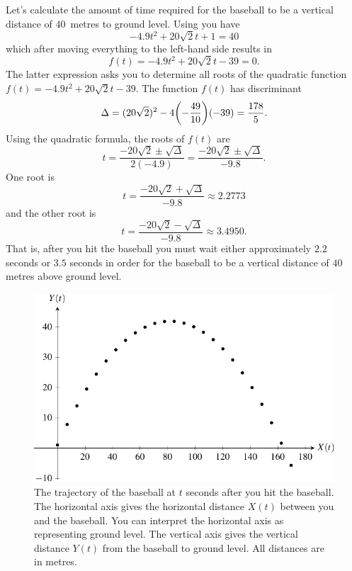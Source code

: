 \documentclass[a4paper,oneside,12pt]{article}
\begin{document}
\begin{problem}
{\begin{solution}
Let's calculate the amount of time required for the baseball to be a
vertical distance of $40$~metres to ground level.  Using
 you have
\[
-4.9 t^2 + 20 \sqrt{2} t + 1
=
40
\]
which after moving everything to the left-hand side results in
\[
f(t)
=
-4.9 t^2 + 20 \sqrt{2} t - 39
=
0.
\]
The latter expression asks you to determine all roots of the quadratic
function $f(t) = -4.9 t^2 + 20 \sqrt{2} t - 39$.  The function $f(t)$
has discriminant
\[
\Delta
=
(20\sqrt{2})^2 - 4\parenthesis*{-\frac{49}{10}} (-39)
=
\frac{178}{5}.
\]
Using the quadratic formula, the roots of $f(t)$ are
\[
t
=
\frac{
  -20\sqrt{2} \pm \sqrt{\Delta}
}{
  2(-4.9)
}
=
\frac{
  -20\sqrt{2} \pm \sqrt{\Delta}
}{
  -9.8
}.
\]
One root is
\[
t
=
\frac{
  -20\sqrt{2} + \sqrt{\Delta}
}{
  -9.8
}
\approx
2.2773
\]
and the other root is
\[
t
=
\frac{
  -20\sqrt{2} - \sqrt{\Delta}
}{
  -9.8
}
\approx
3.4950.
\]
That is, after you hit the baseball you must wait either
approximately $2.2$ seconds or $3.5$ seconds in order for the baseball
to be a vertical distance of $40$ metres above ground level.

\begin{table}[!htbp]
\centering

\caption{%
  The path of the baseball after you hit the baseball.  Values of
  $X(t)$ represent the horizontal distances~(metres) from the baseball
  to you at $t$ seconds after you hit the baseball.  Similarly, values
  of $Y(t)$ represent the vertical distances~(metres) from the
  baseball to ground level at $t$ seconds after you hit the baseball.
  Most values have been rounded to six decimal places.
}
\label{tab:trigonometry:baseball_trajectory}
\end{table}

\begin{figure}[!htbp]
\centering
\includegraphics[scale=1.1]{image/13/baseball-trajectory.pdf}
\caption{%
  The trajectory of the baseball at $t$ seconds after you hit the
  baseball.  The horizontal axis gives the horizontal distance $X(t)$
  between you and the baseball.  You can interpret the horizontal axis
  as representing ground level.  The vertical axis gives the vertical
  distance $Y(t)$ from the baseball to ground level.  All distances
  are in metres.
}
\label{fig:trigonometric:baseball_trajectory}
\end{figure}


\end{solution}}
\end{problem}
\end{document}
